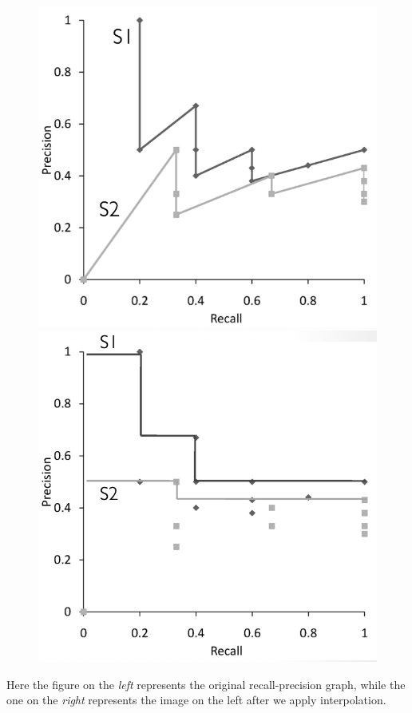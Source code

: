 \documentclass{article}
\begin{document}
\begin{figure}[!htb]
	\begin{minipage}{0.48\textwidth}
	 	\centering
	 	\includegraphics[width=.9\linewidth]{rpg.png}
   	\end{minipage}\hfill
   	\begin{minipage}{0.48\textwidth}
     		\centering
     		\includegraphics[width=.9\linewidth]{interpolation.png}
   	\end{minipage}
\end{figure}
\noindent Here the figure on the \textit{left} represents the original recall-precision graph, while the one on the \textit{right} represents the image on the left after we apply interpolation.
\end{document}
